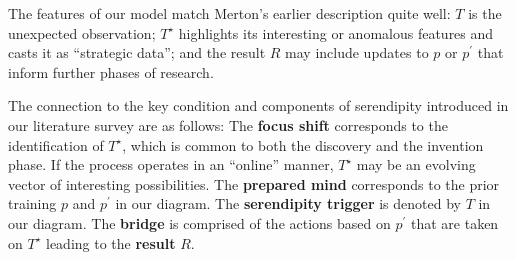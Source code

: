 
The features of our model match Merton's \citeyear{merton1948bearing} earlier description quite
well: $T$ is the unexpected observation; $T^\star$ highlights its
interesting or anomalous features and casts it as ``strategic data''; and the result $R$ may include updates to $p$ or $p^{\prime}$ that inform further phases of research.  

The connection to the key condition and components of serendipity
introduced in our literature survey are as follows:
%
The \textbf{focus shift} corresponds to the identification of
$T^\star$, which is common to both the discovery and the invention
phase.  If the process operates in an ``online'' manner, $T^\star$ may
be an evolving vector of interesting possibilities.
%
The \textbf{prepared mind} corresponds to the prior training $p$ and
$p^{\prime}$ in our diagram.
%
The \textbf{serendipity trigger} is denoted by $T$ in our diagram.
%
The \textbf{bridge} is comprised of the actions based on $p^{\prime}$
that are taken on $T^\star$ leading to the \textbf{result} $R$.


